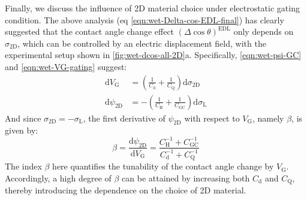 Finally, we discuss the influence of 2D material choice under
electrostatic gating condition. The above analysis (eq
\autoref{eqn:wet-Delta-cos-EDL-final}) has clearly suggested that the contact
angle change effect \((\Delta \cos \theta)^{\mathrm{EDL}}\) only depends
on \(\sigma_{\mathrm{2D}}\), which can be controlled by an electric
displacement field, with the experimental setup shown in 
\autoref{fig:wet-dcos-all-2D}a. Specifically,  \autoref{eqn:wet-psi-GC} and
\autoref{eqn:wet-VG-gating} suggest:
\begin{equation}
\label{eqn:wet-dVG-choice-2D}
\begin{aligned}
\mathrm{d} V_{\mathrm{G}} &= (\frac{1}{C_{\mathrm{d}}} + \frac{1}{C_{\mathrm{Q}}}) \mathrm{d} \sigma_{\mathrm{2D}} \\
\mathrm{d} \psi_{\mathrm{2D}} &= -(\frac{1}{C_{\mathrm{H}}} + \frac{1}{C_{\mathrm{GC}}}) \mathrm{d} \sigma_{\mathrm{L}}
\end{aligned}
\end{equation}
And since \(\sigma_{\mathrm{2D}} = -\sigma_{\mathrm{L}}\), the first
derivative of \(\psi_{\mathrm{2D}}\) with respect to \(V_{\mathrm{G}}\), namely \(\beta\), is given by:
\begin{equation}
\label{eqn:wet-def-beta}
\beta = \dfrac{\mathrm{d} \psi_{\mathrm{2D}}}{\mathrm{d} V_{\mathrm{G}}} 
= \dfrac{C_{\mathrm{H}}^{-1} + C_{\mathrm{GC}}^{-1}}{C_{\mathrm{d}}^{-1} + C_{\mathrm{Q}}^{-1}}
\end{equation}
The index \(\beta\) here quantifies the tunability of the contact angle change
by \(V_{\mathrm{G}}\). Accordingly, a high degree of \(\beta\) can be attained by increasing both \(C_{\mathrm{d}}\) and
\(C_{\mathrm{Q}}\), thereby introducing the dependence on the choice of 2D material.

